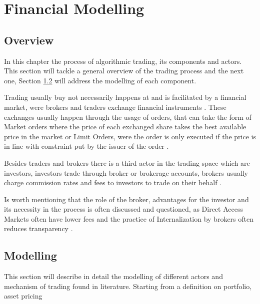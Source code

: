 \chapter{Financial Modelling}
\label{ch2}

\singlespacing %
\minitoc %
\doublespacing %


\section{Overview}

In this chapter the process of algorithmic trading, its components and actors. This section will tackle a general overview of the trading process and the next one, Section \ref{sec::2_Modelling} will address the modelling of each component. 

Trading usually buy not necessarily happens at and is facilitated by a financial market, were brokers and traders exchange financial instruments \cite{hanbookOfFinance_fabozzi,assetPricing}. These exchanges usually happen through the usage of orders, that can take the form of Market orders where the price of each exchanged share  takes the best available price in the market or Limit Orders, were the order is only executed if the price is in line with constraint put by the issuer of the order \cite{market_vs_limit_order}.

Besides traders and brokers there is a third actor in the trading space which are investors, investors trade through broker or brokerage accounts, brokers usually charge commission rates and fees to investors to trade on their behalf \cite{hanbookOfFinance_fabozzi}.

Is worth mentioning that the role of the broker, advantages for the investor and its necessity in the process is often discussed and questioned, as Direct Access Markets often have lower fees and the practice of Internalization by brokers often reduces transparency \cite{hanbookOfFinance_fabozzi,whyDoWeNeedBrokers}. 


\section{Modelling} \label{sec::2_Modelling}
This section will describe in detail the modelling of different actors and mechanism of trading found in literature. Starting from a definition on portfolio, asset pricing

